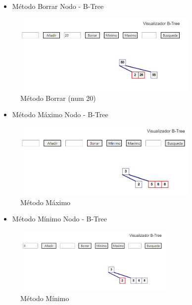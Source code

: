\documentclass{article}
\begin{document}
\begin{enumerate}
\begin{itemize}
   \item Método Borrar Nodo - B-Tree
\end{itemize}

\begin{figure}[H]
\centering
\includegraphics[width=0.8\textwidth]{Img/Borrar_Btree.jpeg}
\caption{Método Borrar (num 20)}
\end{figure}

\begin{itemize}
   \item Método Máximo Nodo - B-Tree
\end{itemize}

\begin{figure}[H]
\centering
\includegraphics[width=0.8\textwidth]{Img/max_Btree.jpeg}
\caption{Método Máximo}
\end{figure}

\begin{itemize}
   \item Método Mínimo Nodo - B-Tree
\end{itemize}

\begin{figure}[H]
\centering
\includegraphics[width=0.7\textwidth]{Img/min_Btree.jpeg}
\caption{Método Mínimo}
\end{figure}


\end{enumerate}
\end{document}
